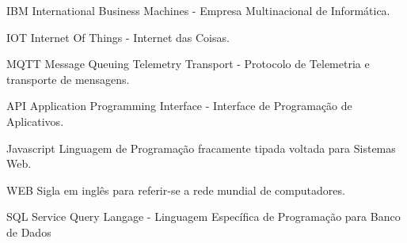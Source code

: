 %
%

\begin{siglas}
    \item[IBM] International Business Machines - Empresa Multinacional de Informática.
    \item[IOT] Internet Of Things - Internet das Coisas.
    \item[MQTT] Message Queuing Telemetry Transport - Protocolo de Telemetria e transporte de mensagens.
    \item[API] Application Programming Interface - Interface de Programação de Aplicativos.
    \item[Javascript] Linguagem de Programação fracamente tipada voltada para Sistemas Web.
    \item[WEB] Sigla em inglês para referir-se a rede mundial de computadores.
    \item[SQL] Service Query Langage - Linguagem Específica de Programação para Banco de Dados
    
\end{siglas}
